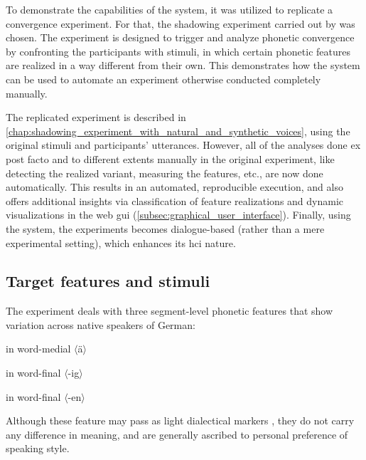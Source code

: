 To demonstrate the capabilities of the system, it was utilized to replicate a convergence experiment.
For that, the shadowing experiment carried out by \citet{Gessinger2017Interspeech} was chosen.
The experiment is designed to trigger and analyze phonetic convergence by confronting the participants with stimuli, in which certain phonetic features are realized in a way different from their own.
This demonstrates how the system can be used to automate an experiment otherwise conducted completely manually.

The replicated experiment is described in \cref{chap:shadowing_experiment_with_natural_and_synthetic_voices}, using the original stimuli and participants' utterances.
However, all of the analyses done ex post facto and to different extents manually in the original experiment, like detecting the realized variant, measuring the features, etc., are now done automatically.
This results in an automated, reproducible execution, and also offers additional insights via classification of feature realizations and dynamic visualizations in the web \ac{gui} (\cref{subsec:graphical_user_interface}).
Finally, using the system, the experiments becomes dialogue-based (rather than a mere experimental setting), which enhances its \ac{hci} nature.

\subsection{Target features and stimuli}
\label{subsec:target_features_and_stimuli}

The experiment deals with three segment-level phonetic features that show variation across native speakers of German:

\begin{description}[labelindent=1.3cm, labelwidth=\widthof{\quad \textipa{[I\c{c}]}~vs.~\textipa{[Ik]}}]
	\item [\textipa{[E:]}~vs.~\textipa{[e:]}] in word-medial $\langle$ä$\rangle$
	\item [\textipa{[I\c{c}]}~vs.~\textipa{[Ik]}] in word-final $\langle$-ig$\rangle$
	\item [\textipa{[\s{n}]}~vs.~\textipa{[@n]}] in word-final $\langle$-en$\rangle$
\end{description}

\noindent
Although these feature may pass as light dialectical markers \citep{Mitterer2013regional}, they do not carry any difference in meaning, and are generally ascribed to personal preference of speaking style.

